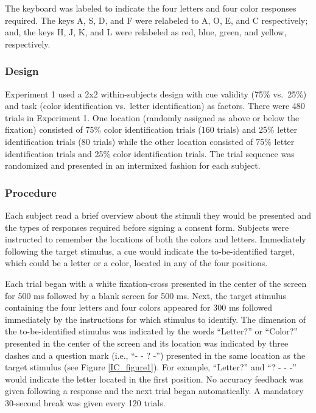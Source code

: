 \documentclass[]{DissertateCUNY}
\begin{document}
The keyboard was labeled to indicate the four letters and four color
responses required. The keys A, S, D, and F were relabeled to A, O, E,
and C respectively; and, the keys H, J, K, and L were relabeled as red,
blue, green, and yellow, respectively.

\hypertarget{design}{%
\subsubsection{Design}\label{design}}

Experiment 1 used a 2x2 within-subjects design with cue validity (75\%
vs.~25\%) and task (color identification vs.~letter identification) as
factors. There were 480 trials in Experiment 1. One location (randomly
assigned as above or below the fixation) consisted of 75\% color
identification trials (160 trials) and 25\% letter identification trials
(80 trials) while the other location consisted of 75\% letter
identification trials and 25\% color identification trials. The trial
sequence was randomized and presented in an intermixed fashion for each
subject.

\hypertarget{procedure}{%
\subsubsection{Procedure}\label{procedure}}

Each subject read a brief overview about the stimuli they would be
presented and the types of responses required before signing a consent
form. Subjects were instructed to remember the locations of both the
colors and letters. Immediately following the target stimulus, a cue
would indicate the to-be-identified target, which could be a letter or a
color, located in any of the four positions.

Each trial began with a white fixation-cross presented in the center of
the screen for 500 ms followed by a blank screen for 500 ms. Next, the
target stimulus containing the four letters and four colors appeared for
300 ms followed immediately by the instructions for which stimulus to
identify. The dimension of the to-be-identified stimulus was indicated
by the words ``Letter?'' or ``Color?'' presented in the center of the
screen and its location was indicated by three dashes and a question
mark (i.e., ``- - ? -'') presented in the same location as the target
stimulus (see Figure \ref{IC_figure1}). For example, ``Letter?'' and ``?
- - -'' would indicate the letter located in the first position. No
accuracy feedback was given following a response and the next trial
began automatically. A mandatory 30-second break was given every 120
trials.
\end{document}
